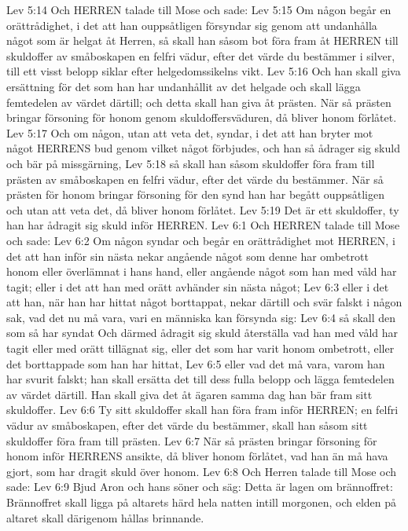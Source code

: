 Lev 5:14  Och HERREN talade till Mose och sade:
Lev 5:15  Om någon begår en orättrådighet, i det att han ouppsåtligen försyndar sig genom att undanhålla något som är helgat åt Herren, så skall han såsom bot föra fram åt HERREN till skuldoffer av småboskapen en felfri vädur, efter det värde du bestämmer i silver, till ett visst belopp siklar efter helgedomssikelns vikt.
Lev 5:16  Och han skall giva ersättning för det som han har undanhållit av det helgade och skall lägga femtedelen av värdet därtill; och detta skall han giva åt prästen. När så prästen bringar försoning för honom genom skuldoffersväduren, då bliver honom förlåtet.
Lev 5:17  Och om någon, utan att veta det, syndar, i det att han bryter mot något HERRENS bud genom vilket något förbjudes, och han så ådrager sig skuld och bär på missgärning,
Lev 5:18  så skall han såsom skuldoffer föra fram till prästen av småboskapen en felfri vädur, efter det värde du bestämmer. När så prästen för honom bringar försoning för den synd han har begått ouppsåtligen och utan att veta det, då bliver honom förlåtet.
Lev 5:19  Det är ett skuldoffer, ty han har ådragit sig skuld inför HERREN.
Lev 6:1  Och HERREN talade till Mose och sade:
Lev 6:2  Om någon syndar och begår en orättrådighet mot HERREN, i det att han inför sin nästa nekar angående något som denne har ombetrott honom eller överlämnat i hans hand, eller angående något som han med våld har tagit; eller i det att han med orätt avhänder sin nästa något;
Lev 6:3  eller i det att han, när han har hittat något borttappat, nekar därtill och svär falskt i någon sak, vad det nu må vara, vari en människa kan försynda sig:
Lev 6:4  så skall den som så har syndat Och därmed ådragit sig skuld återställa vad han med våld har tagit eller med orätt tillägnat sig, eller det som har varit honom ombetrott, eller det borttappade som han har hittat,
Lev 6:5  eller vad det må vara, varom han har svurit falskt; han skall ersätta det till dess fulla belopp och lägga femtedelen av värdet därtill. Han skall giva det åt ägaren samma dag han bär fram sitt skuldoffer.
Lev 6:6  Ty sitt skuldoffer skall han föra fram inför HERREN; en felfri vädur av småboskapen, efter det värde du bestämmer, skall han såsom sitt skuldoffer föra fram till prästen.
Lev 6:7  När så prästen bringar försoning för honom inför HERRENS ansikte, då bliver honom förlåtet, vad han än må hava gjort, som har dragit skuld över honom.
Lev 6:8  Och Herren talade till Mose och sade:
Lev 6:9  Bjud Aron och hans söner och säg: Detta är lagen om brännoffret: Brännoffret skall ligga på altarets härd hela natten intill morgonen, och elden på altaret skall därigenom hållas brinnande.
